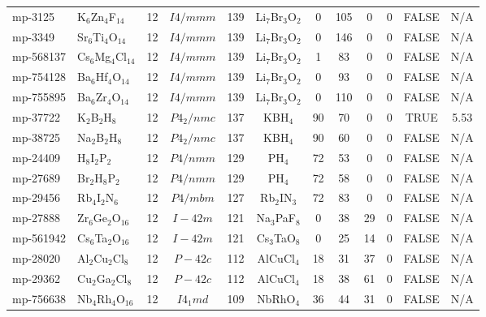 {\begin{longtable}{llcccccccccc}
    mp-3125 & K$_{6}$Zn$_{4}$F$_{14}$ & 12    & $I4/mmm$ & 139   & Li$_{7}$Br$_{3}$O$_{2}$ & 0     & 105   & 0     & 0     & FALSE & N/A \\
    mp-3349 & Sr$_{6}$Ti$_{4}$O$_{14}$ & 12    & $I4/mmm$ & 139   & Li$_{7}$Br$_{3}$O$_{2}$ & 0     & 146   & 0     & 0     & FALSE & N/A \\
    mp-568137 & Cs$_{6}$Mg$_{4}$Cl$_{14}$ & 12    & $I4/mmm$ & 139   & Li$_{7}$Br$_{3}$O$_{2}$ & 1     & 83    & 0     & 0     & FALSE & N/A \\
    mp-754128 & Ba$_{6}$Hf$_{4}$O$_{14}$ & 12    & $I4/mmm$ & 139   & Li$_{7}$Br$_{3}$O$_{2}$ & 0     & 93    & 0     & 0     & FALSE & N/A \\
    mp-755895 & Ba$_{6}$Zr$_{4}$O$_{14}$ & 12    & $I4/mmm$ & 139   & Li$_{7}$Br$_{3}$O$_{2}$ & 0     & 110   & 0     & 0     & FALSE & N/A \\
    mp-37722 & K$_{2}$B$_{2}$H$_{8}$ & 12    & $P4_2/nmc$ & 137   & KBH$_{4}$ & 90    & 70    & 0     & 0     & TRUE  & 5.53  \\
    mp-38725 & Na$_{2}$B$_{2}$H$_{8}$ & 12    & $P4_2/nmc$ & 137   & KBH$_{4}$ & 90    & 60    & 0     & 0     & FALSE & N/A \\
    mp-24409 & H$_{8}$I$_{2}$P$_{2}$ & 12    & $P4/nmm$ & 129   & PH$_{4}$ & 72    & 53    & 0     & 0     & FALSE & N/A \\
    mp-27689 & Br$_{2}$H$_{8}$P$_{2}$ & 12    & $P4/nmm$ & 129   & PH$_{4}$ & 72    & 58    & 0     & 0     & FALSE & N/A \\
    mp-29456 & Rb$_{4}$I$_{2}$N$_{6}$ & 12    & $P4/mbm$ & 127   & Rb$_{2}$IN$_{3}$ & 72    & 83    & 0     & 0     & FALSE & N/A \\
    mp-27888 & Zr$_{6}$Ge$_{2}$O$_{16}$ & 12    & $I-42m$ & 121   & Na$_{3}$PaF$_{8}$ & 0     & 38    & 29    & 0     & FALSE & N/A \\
    mp-561942 & Cs$_{6}$Ta$_{2}$O$_{16}$ & 12    & $I-42m$ & 121   & Cs$_{3}$TaO$_{8}$ & 0     & 25    & 14    & 0     & FALSE & N/A \\
    mp-28020 & Al$_{2}$Cu$_{2}$Cl$_{8}$ & 12    & $P-42c$ & 112   & AlCuCl$_{4}$ & 18    & 31    & 37    & 0     & FALSE & N/A \\
    mp-29362 & Cu$_{2}$Ga$_{2}$Cl$_{8}$ & 12    & $P-42c$ & 112   & AlCuCl$_{4}$ & 18    & 38    & 61    & 0     & FALSE & N/A \\
    mp-756638 & Nb$_{4}$Rh$_{4}$O$_{16}$ & 12    & $I4_1md$ & 109   & NbRhO$_{4}$ & 36    & 44    & 31    & 0     & FALSE & N/A \\

\end{longtable}}
